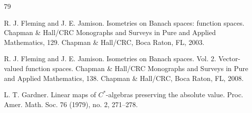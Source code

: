 \documentclass[leqno]{article} %
\numberwithin{equation}{section}
\begin{document}
\begin{thebibliography}{79}










R. J. Fleming and J. E. Jamison.
\newblock Isometries on Banach spaces: function spaces.
\newblock Chapman \& Hall/CRC Monographs and Surveys in Pure and Applied Mathematics, 129. Chapman \& Hall/CRC, Boca Raton, FL, 2003.

R. J. Fleming and J. E. Jamison.
\newblock Isometries on Banach spaces. Vol. 2. Vector-valued function spaces.
\newblock Chapman \& Hall/CRC Monographs and Surveys in Pure and Applied Mathematics, 138. Chapman \& Hall/CRC, Boca Raton, FL, 2008.
  

L. T. Gardner.
\newblock Linear maps of $C^*$-algebras preserving the absolute value.
\newblock Proc. Amer. Math. Soc. 76 (1979), no. 2, 271--278. 


\end{thebibliography}
\end{document}
